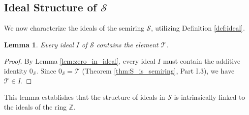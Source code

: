 \documentclass[11pt, a4paper]{article}
\theoremstyle{plain}
\newtheorem{lemma}[theorem]{Lemma}
\theoremstyle{definition}
\numberwithin{equation}{section}
\newcommand{\Z}{\mathbb{Z}}
\newcommand{\Tobj}{\mathcal{T}} %
\newcommand{\SemiringS}{\mathcal{S}}
\begin{document}
\subsection{Ideal Structure of \texorpdfstring{$\SemiringS$}{S}}

We now characterize the ideals of the semiring $\SemiringS$, utilizing Definition \ref{def:ideal}.

\begin{lemma}\label{lem:T_in_ideal}
Every ideal $I$ of $\SemiringS$ contains the element $\Tobj$.
\end{lemma}
\begin{proof}
By Lemma \ref{lem:zero_in_ideal}, every ideal $I$ must contain the additive identity $0_{\SemiringS}$. Since $0_{\SemiringS}=\Tobj$ (Theorem \ref{thm:S_is_semiring}, Part I.3), we have $\Tobj \in I$.
\end{proof}

This lemma establishes that the structure of ideals in $\SemiringS$ is intrinsically linked to the ideals of the ring $\Z$.
\end{document}
